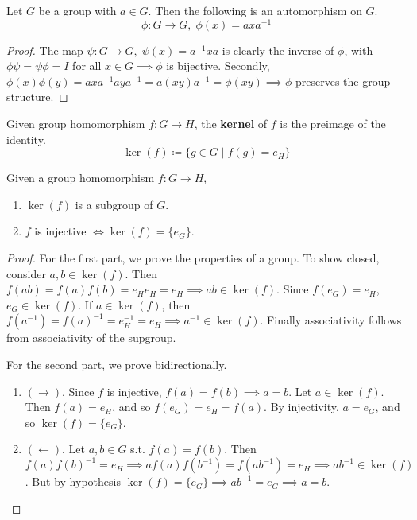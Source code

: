   \begin{theorem}
    Let $G$ be a group with $a \in G$. Then the following is an automorphism on $G$. 
    \begin{equation}
      \phi: G \longrightarrow G, \; \phi (x) = a x a^{-1}
    \end{equation}
  \end{theorem}
  \begin{proof}
    The map $\psi: G \longrightarrow G, \; \psi(x) = a^{-1} x a$ is clearly the inverse of $\phi$, with $\phi \psi = \psi \phi = I$ for all $x \in G \implies \phi$ is bijective. Secondly, $\phi(x) \phi(y) = a x a^{-1} a y a^{-1} = a (x y) a ^{-1} = \phi (x y) \implies \phi$ preserves the group structure. 
  \end{proof} 

  \begin{definition}[Kernel]
    Given group homomorphism $f: G \rightarrow H$, the \textbf{kernel} of $f$ is the preimage of the identity. 
    \begin{equation}
      \ker(f) \coloneqq \{g \in G \mid f(g) = e_H\}
    \end{equation}
  \end{definition} 

  \begin{theorem}
    Given a group homomorphism $f: G \rightarrow H$, 
    \begin{enumerate}
      \item $\ker(f)$ is a subgroup of $G$.  
      \item $f$ is injective $\iff \ker(f) = \{e_G\}$. 
    \end{enumerate}
  \end{theorem}
  \begin{proof}
    For the first part, we prove the properties of a group. To show closed, consider $a, b \in \ker(f)$. Then $f(ab) = f(a) f(b) = e_H e_H = e_H \implies ab \in \ker(f)$. Since $f(e_G) = e_H$, $e_G \in \ker(f)$. If $a \in \ker(f)$, then $f(a^{-1}) = f(a)^{-1} = e_H^{-1} = e_H \implies a^{-1} \in \ker(f)$. Finally associativity follows from associativity of the supgroup. 

    For the second part, we prove bidirectionally. 
    \begin{enumerate}
      \item $(\rightarrow)$. Since $f$ is injective, $f(a) = f(b) \implies a = b$. Let $a \in \ker(f)$. Then $f(a) = e_H$, and so $f(e_G) = e_H = f(a)$. By injectivity, $a = e_G$, and so $\ker(f) = \{e_G\}$. 
      \item $(\leftarrow)$. Let $a, b \in G$ s.t. $f(a) = f(b)$. Then $f(a) f(b)^{-1} = e_H \implies af(a) f(b^{-1}) = f(a b^{-1}) = e_H \implies ab^{-1} \in \ker(f)$. But by hypothesis $\ker(f) = \{e_G\} \implies ab^{-1} = e_G \implies a = b$. 
    \end{enumerate}
  \end{proof}

